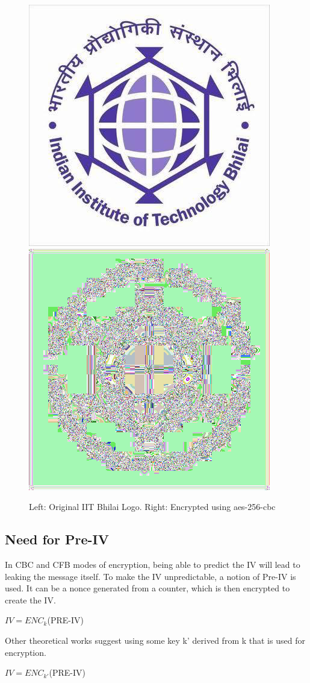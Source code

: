 \documentclass[12pt]{article}
\begin{document}
\begin{figure}[h!]

\centering\includegraphics[width = 0.45\linewidth]{./ECB_Pic/IITBhilaiLogo.png}
\centering\includegraphics[width = 0.45\linewidth]{./ECB_Pic/IITBhilaiLogoEnc.png}

\caption{Left: Original IIT Bhilai Logo. Right: Encrypted using aes-256-cbc}

\end{figure}

\subsection{Need for Pre-IV}

In CBC and CFB modes of encryption, being able to predict the IV will lead to leaking the message itself. To make the IV unpredictable, a notion of Pre-IV is used. It can be a nonce generated from a counter, which is then encrypted to create the IV.

\begin{center}

$IV = ENC_k$(PRE-IV)

\end{center}
Other theoretical works suggest using some key k' derived from k that is used for encryption.
\begin{center}

$IV = ENC_{k'}$(PRE-IV)

\end{center}

\begin{large}

\end{large}
\end{document}
